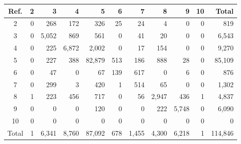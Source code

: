 \begin{tabular}{crrrrrrrrrr}
\toprule
Ref. & 2 & 3 & 4 & 5 & 6 & 7 & 8 & 9 & 10 & Total \\
\midrule
2 & 0 & 268 & 172 & 326 & 25 & 24 & 4 & 0 & 0 & 819 \\
3 & 0 & 5,052 & 869 & 561 & 0 & 41 & 20 & 0 & 0 & 6,543 \\
4 & 0 & 225 & 6,872 & 2,002 & 0 & 17 & 154 & 0 & 0 & 9,270 \\
5 & 0 & 227 & 388 & 82,879 & 513 & 186 & 888 & 28 & 0 & 85,109 \\
6 & 0 & 47 & 0 & 67 & 139 & 617 & 0 & 6 & 0 & 876 \\
7 & 0 & 299 & 3 & 420 & 1 & 514 & 65 & 0 & 0 & 1,302 \\
8 & 1 & 223 & 456 & 717 & 0 & 56 & 2,947 & 436 & 1 & 4,837 \\
9 & 0 & 0 & 0 & 120 & 0 & 0 & 222 & 5,748 & 0 & 6,090 \\
10 & 0 & 0 & 0 & 0 & 0 & 0 & 0 & 0 & 0 & 0 \\
\midrule
Total & 1 & 6,341 & 8,760 & 87,092 & 678 & 1,455 & 4,300 & 6,218 & 1 & 114,846 \\
\bottomrule
\end{tabular}
